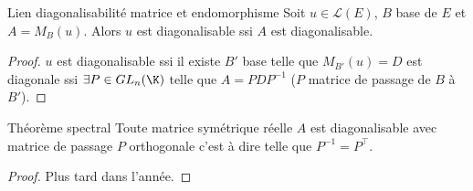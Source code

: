 \begin{proposition}{Lien diagonalisabilité matrice et endomorphisme}{}
    Soit $u \in \mathscr L(E)$, $B$ base de $E$ et $A = M_B(u)$. Alors $u$ est diagonalisable ssi $A$ est diagonalisable.
\end{proposition}

\begin{proof}
    $u$ est diagonalisable ssi il existe $B'$ base telle que $M_{B'}(u) = D$ est diagonale
    ssi $\exists P \in GL_n(\K)$ telle que $A = P D P^{-1}$ ($P$ matrice de passage de $B$ à $B'$).
\end{proof}

\begin{theoreme}{Théorème spectral}{}
    Toute matrice symétrique réelle $A$ est diagonalisable avec matrice de passage $P$ orthogonale
    c'est à dire telle que $P^{-1} = P^\top$.    
\end{theoreme}

\begin{proof}
    Plus tard dans l'année. 
\end{proof}

